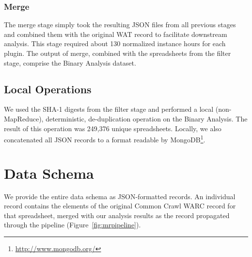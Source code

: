 \documentclass{svjour3}
\begin{document}
\subsubsection{Merge} 

The merge stage simply took the resulting JSON files from all previous stages and combined them with the original WAT record to facilitate downstream analysis. This stage required about 130 normalized instance hours for each plugin. The output of merge, combined with the spreadsheets from the filter stage, comprise the Binary Analysis dataset.

\subsection{Local Operations}


We used the SHA-1 digests from the filter stage and performed a local (non-MapReduce), deterministic, de-duplication operation on the Binary Analysis. The result of this operation was 249,376 unique spreadsheets. Locally, we also concatenated all JSON records to a format readable by MongoDB\footnote{\url{http://www.mongodb.org/}}.







\section{Data Schema}
\label{sec:schema}


We provide the entire data schema as JSON-formatted records. An individual record contains the elements of the original Common Crawl WARC record for that spreadsheet, merged with our analysis results as the record propagated through the pipeline (Figure~\ref{fig:mrpipeline}).
\end{document}
